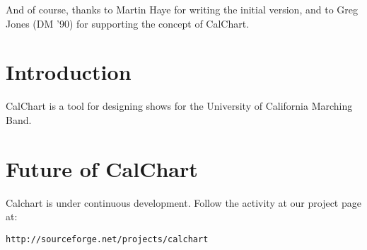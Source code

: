 And of course, thanks to Martin Haye for writing the initial version,
and to Greg Jones (DM '90) for supporting the concept of CalChart.

\chapter{Introduction}

CalChart is a tool for designing shows for the University of California
Marching Band.








\chapter{Future of CalChart}\label{future}

Calchart is under continuous development.  Follow the activity at our
project page at:
\begin{verbatim}
http://sourceforge.net/projects/calchart
\end{verbatim}




